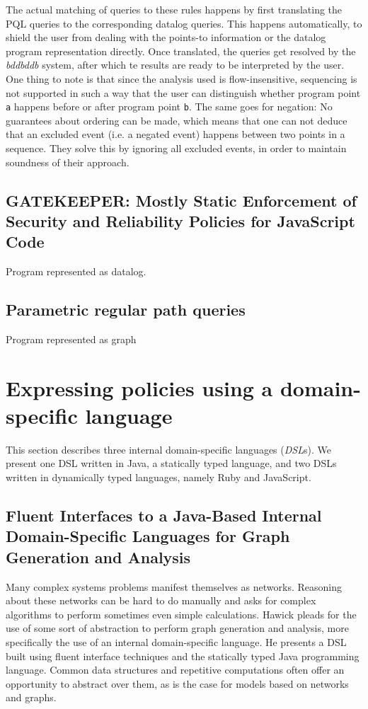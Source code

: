 The actual matching of queries to these rules happens by first translating the PQL queries to the corresponding datalog queries. This happens automatically, to shield the user from dealing with the points-to information or the datalog program representation directly. Once translated, the queries get resolved by the \textit{bddbddb} system, after which te results are ready to be interpreted by the user. One thing to note is that since the analysis used is flow-insensitive, sequencing is not supported in such a way that the user can distinguish whether program point \texttt{a} happens before or after program point \texttt{b}. The same goes for negation: No guarantees about ordering can be made, which means that one can not deduce that an excluded event (i.e. a negated event) happens between two points in a sequence. They solve this by ignoring all excluded events, in order to maintain soundness of their approach.


\subsection{GATEKEEPER: Mostly Static Enforcement of Security and Reliability Policies for JavaScript Code}
Program represented as datalog.

\subsection{Parametric regular path queries}
Program represented as graph

\section{Expressing policies using a domain-specific language} %

This section describes three internal domain-specific languages (\textit{DSL}s). We present one DSL written in Java, a statically typed language, and two DSLs written in dynamically typed languages, namely Ruby and JavaScript.

\subsection{Fluent Interfaces to a Java-Based Internal Domain-Specific Languages for Graph Generation and Analysis}
Many complex systems problems manifest themselves as networks. Reasoning about these networks can be hard to do manually and asks for complex algorithms to perform sometimes even simple calculations. Hawick\cite{FluentInterfacesJava} pleads for the use of some sort of abstraction to perform graph generation and analysis, more specifically the use of an internal domain-specific language. He presents a DSL built using fluent interface techniques and the statically typed Java programming language. Common data structures and repetitive computations often offer an opportunity to abstract over them, as is the case for models based on networks and graphs.

